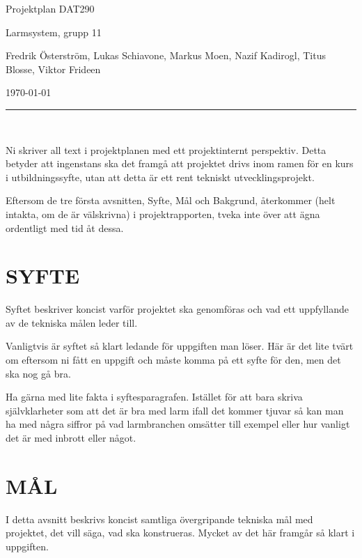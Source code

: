 \documentclass[a4paper]{article}
\begin{document}
\begin{center}
\thispagestyle{empty}
\parskip=14pt%
\vspace*{3\parskip}%

{\LARGE Projektplan DAT290}

{\large Larmsystem, grupp 11

Fredrik Österström, Lukas Schiavone, Markus Moen, Nazif Kadirogl, Titus Blosse, Viktor Frideen

\today}


\rule{7cm}{0.4pt}\\
\end{center}
\newpage

\thispagestyle{empty}
\tableofcontents
\newpage


Ni skriver all text i projektplanen med ett projektinternt perspektiv.
Detta betyder att ingenstans ska det framgå att projektet drivs inom
ramen för en kurs i utbildningssyfte, utan att detta är ett rent
tekniskt utvecklingsprojekt.

Eftersom de tre första avsnitten, Syfte, Mål och Bakgrund, återkommer
(helt intakta, om de är välskrivna) i projektrapporten, tveka inte över
att ägna ordentligt med tid åt dessa.



\section{SYFTE}


Syftet beskriver koncist varför projektet ska genomföras och vad ett
uppfyllande av de tekniska målen leder till.

Vanligtvis är syftet så klart ledande för uppgiften man löser. Här är
det lite tvärt om eftersom ni fått en uppgift och måste komma på ett
syfte för den, men det ska nog gå bra.

Ha gärna med lite fakta i syftesparagrafen. Istället för att bara skriva
självklarheter som att det är bra med larm ifall det kommer tjuvar så
kan man ha med några siffror på vad larmbranchen omsätter till exempel
eller hur vanligt det är med inbrott eller något.



\section{MÅL}


I detta avsnitt beskrivs koncist samtliga övergripande tekniska mål med
projektet, det vill säga, vad ska konstrueras. Mycket av det här
framgår så klart i uppgiften.
\end{document}
